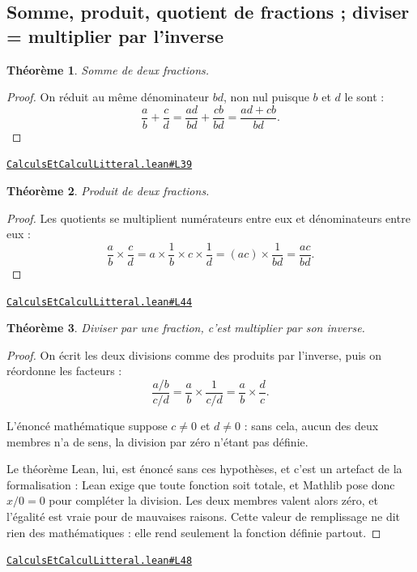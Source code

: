 \documentclass[11pt,a4paper]{article}
\theoremstyle{definition}
\theoremstyle{plain}
\newtheorem{theoreme}{Théorème}
\newcommand{\source}[2]{\par\smallskip\noindent\hfill{\footnotesize\href{#1}{\texttt{#2}}}\par\smallskip}
\begin{document}
\subsection{Somme, produit, quotient de fractions ; diviser = multiplier par l'inverse}

\begin{theoreme}
Somme de deux fractions.
\end{theoreme}

\begin{proof}
On réduit au même dénominateur $bd$, non nul puisque $b$ et $d$ le sont :
\[
\frac{a}{b} + \frac{c}{d} = \frac{ad}{bd} + \frac{cb}{bd} = \frac{ad + cb}{bd} .
\]
\end{proof}
\source{https://github.com/Commutator-IO/learn-lean/blob/main/courses/01-college/01-nombres-et-calculs/CalculsEtCalculLitteral.lean\#L39}{CalculsEtCalculLitteral.lean\#L39}

\begin{theoreme}
Produit de deux fractions.
\end{theoreme}

\begin{proof}
Les quotients se multiplient numérateurs entre eux et dénominateurs entre eux :
\[
\frac{a}{b} \times \frac{c}{d}
  = a \times \frac1b \times c \times \frac1d
  = (ac) \times \frac{1}{bd}
  = \frac{ac}{bd} .
\]
\end{proof}
\source{https://github.com/Commutator-IO/learn-lean/blob/main/courses/01-college/01-nombres-et-calculs/CalculsEtCalculLitteral.lean\#L44}{CalculsEtCalculLitteral.lean\#L44}

\begin{theoreme}
Diviser par une fraction, c'est multiplier par son inverse.
\end{theoreme}

\begin{proof}
On écrit les deux divisions comme des produits par l'inverse, puis on réordonne les
facteurs :
\[
\frac{a/b}{c/d} = \frac{a}{b} \times \frac{1}{c/d}
                = \frac{a}{b} \times \frac{d}{c} .
\]

L'énoncé mathématique suppose $c \ne 0$ et $d \ne 0$ : sans cela, aucun des deux membres
n'a de sens, la division par zéro n'étant pas définie.

Le théorème Lean, lui, est énoncé sans ces hypothèses, et c'est un artefact de la
formalisation : Lean exige que toute fonction soit totale, et Mathlib pose donc
$x/0 = 0$ pour compléter la division. Les deux membres valent alors zéro, et l'égalité
est vraie pour de mauvaises raisons. Cette valeur de remplissage ne dit rien des
mathématiques : elle rend seulement la fonction définie partout.
\end{proof}
\source{https://github.com/Commutator-IO/learn-lean/blob/main/courses/01-college/01-nombres-et-calculs/CalculsEtCalculLitteral.lean\#L48}{CalculsEtCalculLitteral.lean\#L48}
\end{document}

